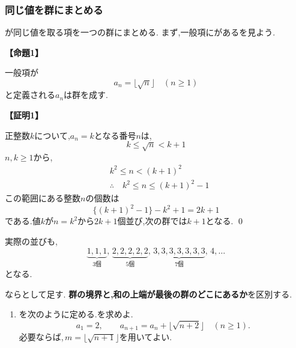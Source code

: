   \subsubsection{同じ値を群にまとめる}\label{節：ガウス型の群数列}
    が同じ値を取る項を一つの群にまとめる.
    まず,一般項にがあるを見よう.

    \noindent{}\label{証明：ガウス型の群数列}\textbf{【命題1】}\par\nobreak
    \begin{smallquote}
      一般項が
      \[
        a_n=\lfloor \sqrt{n} \rfloor\quad(n\ge1)
      \]
      と定義される$a_n$は群を成す.
    \end{smallquote}
    \noindent \textbf{【証明1】}\par\nobreak
    \begin{smallquote}
      正整数$k$について,$a_n=k$となる番号$n$は,
      \[
        k\le\sqrt{n}<k+1
      \]
      $n,k\ge1$から,
      \begin{align*}
          & k^2\le n <(k+1)^2                      \\
          & \therefore\quad k^2\le n \le (k+1)^2-1
      \end{align*}
      この範囲にある整数$n$の個数は
      \[
        \{(k+1)^2-1\}-k^2+1=2k+1
      \]
      である.値$k$が$n=k^2$から$2k+1$個並び,次の群では$k+1$となる. \qed
    \end{smallquote}

    実際の並びも,
    \[
      \underbrace{1,1,1}_{3\text{個}},\,
      \underbrace{2,2,2,2,2}_{5\text{個}},\,
      \underbrace{3,3,3,3,3,3,3}_{7\text{個}},\,4,\ldots
    \]
    となる.

    ならとして足す.
    \textbf{群の境界と,和の上端が最後の群のどこにあるか}を区別する.

    \noindent {}\par\nobreak
    \begin{enumerate}[label=(\arabic*),parsep=3pt,beginpenalty=10000,format=\bookitemlink{example-gauss-role-2}{problem}{answer}]
      \item {}を次のように定める.を求めよ.
            \[
              a_1=2,\qquad
              a_{n+1}=a_n+\lfloor\sqrt{n+2}\rfloor
              \quad(n\ge1).
            \]
            必要ならば,\,$m=\lfloor\sqrt{n+1}\rfloor$を用いてよい.
    \end{enumerate}


